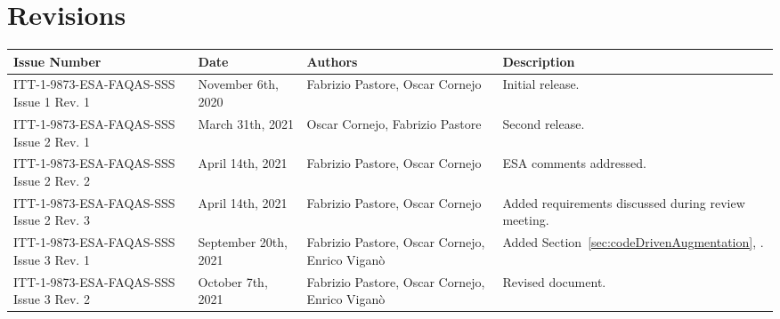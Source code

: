 
\section*{Revisions}
\label{sec:revisions}

\setlength\LTleft{0pt}
\setlength\LTright{0pt}
\scriptsize 
\begin{longtable}{|p{2cm}|p{2cm}|p{2cm}|p{7cm}|@{}}
\label{table:codeoperators} \\
\hline
\textbf{Issue Number}&\textbf{Date}&\textbf{Authors}&\textbf{Description}\\
\hline
ITT-1-9873-ESA-FAQAS-SSS
Issue 1 Rev. 1&
November 6th, 2020&
Fabrizio Pastore, Oscar Cornejo&
\begin{minipage}{8cm}
Initial release.
\end{minipage}
\\
\hline
ITT-1-9873-ESA-FAQAS-SSS
Issue 2 Rev. 1&
March 31th, 2021&
Oscar Cornejo, Fabrizio Pastore&
\begin{minipage}{8cm}
Second release.
\end{minipage}
\\
\hline
ITT-1-9873-ESA-FAQAS-SSS
Issue 2 Rev. 2&
April 14th, 2021&
Fabrizio Pastore, Oscar Cornejo&
\begin{minipage}{8cm}
ESA comments addressed.
\end{minipage}
\\
\hline
ITT-1-9873-ESA-FAQAS-SSS
Issue 2 Rev. 3&
April 14th, 2021&
Fabrizio Pastore, Oscar Cornejo&
\begin{minipage}{8cm}
Added requirements discussed during review meeting.
\end{minipage}
\\
\hline
ITT-1-9873-ESA-FAQAS-SSS
Issue 3 Rev. 1&
September 20th, 2021&
Fabrizio Pastore, Oscar Cornejo, Enrico Viganò&
\begin{minipage}{8cm}
Added Section~\ref{sec:codeDrivenAugmentation}, .
\end{minipage}
\\
\hline
ITT-1-9873-ESA-FAQAS-SSS
Issue 3 Rev. 2&
October 7th, 2021&
Fabrizio Pastore, Oscar Cornejo, Enrico Viganò&
\begin{minipage}{8cm}
Revised document.
\end{minipage}
\\
\hline




\end{longtable}
